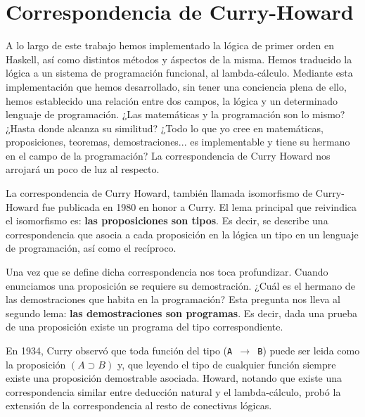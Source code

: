 \chapter{Correspondencia de Curry-Howard}

A lo largo de este trabajo hemos implementado la lógica de primer orden
en Haskell, así como distintos métodos y áspectos de la misma. Hemos
traducido la lógica a un sistema de programación funcional, al lambda-cálculo.
Mediante esta implementación que hemos desarrollado, sin tener una conciencia
plena de ello, hemos establecido una relación entre dos campos, la lógica y
un determinado lenguaje de programación. ¿Las matemáticas y la programación
son lo mismo? ¿Hasta donde alcanza su similitud? ¿Todo lo que yo cree en
matemáticas, proposiciones, teoremas, demostraciones... es implementable y
tiene su hermano en el campo de la programación? La correspondencia de Curry
Howard nos arrojará un poco de luz al respecto.

\vspace{5mm}

La correspondencia de Curry Howard, también llamada isomorfismo de Curry-Howard
fue publicada en 1980 en honor a Curry. El lema principal que reivindica el isomorfismo es:
\textbf{las proposiciones son tipos}. Es decir, se describe una correspondencia
que asocia a cada proposición en la lógica un tipo en un lenguaje de programación,
así como el recíproco.

\vspace{5mm}
Una vez que se define dicha correspondencia nos toca profundizar. Cuando
enunciamos una proposición se requiere su demostración. ¿Cuál es el hermano
de las demostraciones que habita en la programación? Esta pregunta nos lleva al segundo
lema: \textbf{las demostraciones son programas}. Es decir, dada una prueba de
una proposición existe un programa del tipo correspondiente.

\vspace{5mm}


En 1934, Curry observó que toda función del tipo (\texttt{A $\rightarrow$ B})
puede ser leida como la proposición $(A\supset B)$ y, que leyendo el tipo de
cualquier función siempre existe una proposición demostrable asociada. Howard,
notando que existe una correspondencia similar entre deducción natural y el
lambda-cálculo, probó la extensión de la correspondencia al resto de conectivas lógicas.


